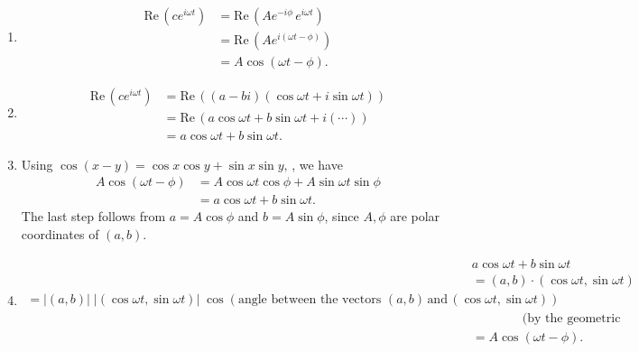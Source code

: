 \Proofs \\
\begin{enumerate}
\item
  \begin{align*}
    \displaystyle  \mathrm{Re\, }\left(c e^{i\omega t} \right)
    & \displaystyle = \mathrm{Re\, }\left(A e^{-i \phi } \,  e^{i\omega t} \right) \\
    & \displaystyle = \mathrm{Re\, }\left( A e^{i(\omega t - \phi )} \right) \\
    & \displaystyle = A \cos (\omega t - \phi ).
  \end{align*}
\item
  \begin{align*}
    \displaystyle  \mathrm{Re\, }\left(c e^{i\omega t} \right)
    & \displaystyle = \mathrm{Re\, }\left( (a-bi) (\cos \omega t + i \sin \omega t) \right) \\
    & \displaystyle = \mathrm{Re\, }\left(a \cos \omega t + b \sin \omega t + i(\cdots ) \right) \\
    & \displaystyle = a \cos \omega t + b \sin \omega t.
  \end{align*}
\item Using $\cos (x-y)=\cos x \cos y + \sin x \sin y,\,$, we have
  \begin{align*}
    \displaystyle  A \cos (\omega t - \phi )
    & \displaystyle = A \cos \omega t \cos \phi + A \sin \omega t \sin \phi \\
    & \displaystyle = a \cos \omega t + b \sin \omega t.
  \end{align*}
  The last step follows from $ a = A \cos \phi$ and $b = A \sin \phi$, since
  $A, \phi$ are polar coordinates of $(a,b)$.
\item
  \begin{align*}
    &\displaystyle a \cos \omega t + b \sin \omega t \\
    &\displaystyle = (a,b) \cdot (\cos \omega t,\sin \omega t) \\
    \displaystyle = |(a,b)| \;  |(\cos \omega t,\sin \omega t)| \;
    \cos \left(\text {angle between the vectors } (a,b) \,
    \text {and}\,  (\cos \omega t,\sin \omega t)\right) \\
    &\displaystyle \qquad \qquad (\text {by the geometric interpretation of the dot product)} \\
    &\displaystyle = A \cos (\omega t - \phi ).
  \end{align*}
\end{enumerate}
\clearpage

